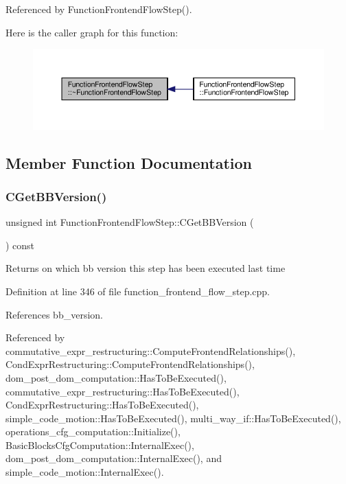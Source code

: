 Referenced by Function\+Frontend\+Flow\+Step().

Here is the caller graph for this function\+:
\nopagebreak
\begin{figure}[H]
\begin{center}
\leavevmode
\includegraphics[width=350pt]{d8/d0a/classFunctionFrontendFlowStep_a98d5dace07585982ed44b425805051b3_icgraph}
\end{center}
\end{figure}


\subsection{Member Function Documentation}
\mbox{\label{classFunctionFrontendFlowStep_a3b2bc26e306ec1bb81f0c70b40632899}} 
\subsubsection{\texorpdfstring{C\+Get\+B\+B\+Version()}{CGetBBVersion()}}
{\footnotesize\ttfamily unsigned int Function\+Frontend\+Flow\+Step\+::\+C\+Get\+B\+B\+Version (\begin{DoxyParamCaption}{ }\end{DoxyParamCaption}) const}

\begin{DoxyReturn}{Returns}
on which bb version this step has been executed last time 
\end{DoxyReturn}


Definition at line 346 of file function\+\_\+frontend\+\_\+flow\+\_\+step.\+cpp.



References bb\+\_\+version.



Referenced by commutative\+\_\+expr\+\_\+restructuring\+::\+Compute\+Frontend\+Relationships(), Cond\+Expr\+Restructuring\+::\+Compute\+Frontend\+Relationships(), dom\+\_\+post\+\_\+dom\+\_\+computation\+::\+Has\+To\+Be\+Executed(), commutative\+\_\+expr\+\_\+restructuring\+::\+Has\+To\+Be\+Executed(), Cond\+Expr\+Restructuring\+::\+Has\+To\+Be\+Executed(), simple\+\_\+code\+\_\+motion\+::\+Has\+To\+Be\+Executed(), multi\+\_\+way\+\_\+if\+::\+Has\+To\+Be\+Executed(), operations\+\_\+cfg\+\_\+computation\+::\+Initialize(), Basic\+Blocks\+Cfg\+Computation\+::\+Internal\+Exec(), dom\+\_\+post\+\_\+dom\+\_\+computation\+::\+Internal\+Exec(), and simple\+\_\+code\+\_\+motion\+::\+Internal\+Exec().

